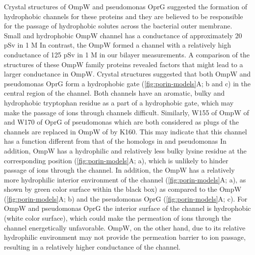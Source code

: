 Crystal structures of \ecoli OmpW and \ac{pseudomonas} OprG suggested the formation of hydrophobic channels for these proteins and they are believed to be responsible for the passage of hydrophobic solutes across the bacterial outer membrane. Small and hydrophobic \ecoli OmpW channel has a conductance of approximately 20 \si{\pico\sievert} in 1 M  In contrast, the \caulobacter OmpW formed a channel with a relatively high conductance of 125 \si{\pico\sievert} in 1 M  in our bilayer measurements. A comparison of the structures of these OmpW family proteins revealed factors that might lead to a larger conductance in \caulobacter OmpW. Crystal structures suggested that both \ecoli OmpW and \ac{pseudomonas} OprG form a hydrophobic gate (\cref{fig:porin-models}A; b and c) in the central region of the channel. Both channels have an aromatic, bulky and hydrophobic tryptophan residue as a part of a hydrophobic gate, which may make the passage of ions through channels difficult. Similarly, W155 of OmpW of \ecoli{} and W170 of OprG of \ac{pseudomonas} which are both considered as plugs of the channels are replaced in OmpW of \caulobacter by K160. This may indicate that this channel has a function different from that of the homologs in \ecoli and \ac{pseudomonas} In addition, \caulobacter OmpW has a hydrophilic and relatively less bulky lysine residue at the corresponding position (\cref{fig:porin-models}A; a), which is unlikely to hinder passage of ions through the channel. In addition, the \caulobacter OmpW has a relatively more hydrophilic interior environment of the channel (\cref{fig:porin-models}A; a), as shown by green color surface within the black box) as compared to the \ecoli OmpW (\cref{fig:porin-models}A; b) and the  \ac{pseudomonas} OprG (\cref{fig:porin-models}A; c). For \ecoli OmpW and \ac{pseudomonas} OprG the interior surface of the channel is hydrophobic (white color surface), which could make the permeation of ions through the channel energetically unfavorable. \caulobacter OmpW, on the other hand, due to its relative hydrophilic environment may not provide the permeation barrier to ion passage, resulting in a relatively higher conductance of the channel. 


